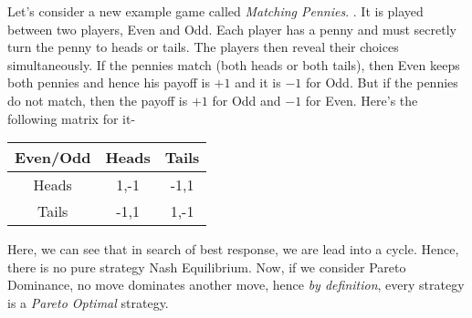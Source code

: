 Let's consider a new example game called \textit{Matching Pennies}.  . It is played between two players, Even and Odd. Each player has a penny and must secretly turn the penny to heads or tails. The players then reveal their choices simultaneously. If the pennies match (both heads or both tails), then Even keeps both pennies and hence his payoff is $+1$ and it is $-1$ for Odd. But if the pennies do not match, then the payoff is $+1$ for Odd and $-1$ for Even.\newline
Here's the following matrix for it-
	         \begin{center}
		\begin{tabular}{|c|c|c|}\hline
		Even/Odd & Heads & Tails \\ \hline
		Heads &  1,-1 & -1,1 \\ \hline
		Tails & -1,1 & 1,-1 \\ \hline
		\end{tabular}
		\end{center}
Here, we can see that in search of best response, we are lead into a cycle. Hence, there is no pure strategy Nash Equilibrium.
Now, if we consider Pareto Dominance, no move dominates another move, hence \textit{by definition}, every strategy is a \textit{Pareto Optimal} strategy.
